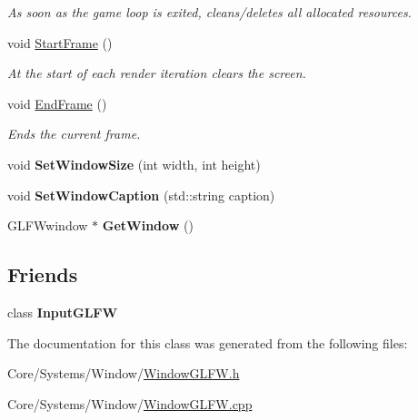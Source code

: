 \begin{DoxyCompactItemize}
\begin{DoxyCompactList}\small\item\em As soon as the game loop is exited, cleans/deletes all allocated resources. \end{DoxyCompactList}\item 
\hypertarget{classDCEngine_1_1Systems_1_1WindowGLFW_a09d7b716caed459967d25d527c950f28}{void \hyperlink{classDCEngine_1_1Systems_1_1WindowGLFW_a09d7b716caed459967d25d527c950f28}{Start\-Frame} ()}\label{classDCEngine_1_1Systems_1_1WindowGLFW_a09d7b716caed459967d25d527c950f28}

\begin{DoxyCompactList}\small\item\em At the start of each render iteration clears the screen. \end{DoxyCompactList}\item 
\hypertarget{classDCEngine_1_1Systems_1_1WindowGLFW_a35fda5b7925aa2c54d07b731c5b8ec3f}{void \hyperlink{classDCEngine_1_1Systems_1_1WindowGLFW_a35fda5b7925aa2c54d07b731c5b8ec3f}{End\-Frame} ()}\label{classDCEngine_1_1Systems_1_1WindowGLFW_a35fda5b7925aa2c54d07b731c5b8ec3f}

\begin{DoxyCompactList}\small\item\em Ends the current frame. \end{DoxyCompactList}\item 
\hypertarget{classDCEngine_1_1Systems_1_1WindowGLFW_a04af056648972074806a030f4407f6be}{void {\bfseries Set\-Window\-Size} (int width, int height)}\label{classDCEngine_1_1Systems_1_1WindowGLFW_a04af056648972074806a030f4407f6be}

\item 
\hypertarget{classDCEngine_1_1Systems_1_1WindowGLFW_afc36452ab50f4975c6a3ad86ccbeddbd}{void {\bfseries Set\-Window\-Caption} (std\-::string caption)}\label{classDCEngine_1_1Systems_1_1WindowGLFW_afc36452ab50f4975c6a3ad86ccbeddbd}

\item 
\hypertarget{classDCEngine_1_1Systems_1_1WindowGLFW_a7242f399d0caf6cde5a62579ad3fd936}{G\-L\-F\-Wwindow $\ast$ {\bfseries Get\-Window} ()}\label{classDCEngine_1_1Systems_1_1WindowGLFW_a7242f399d0caf6cde5a62579ad3fd936}

\end{DoxyCompactItemize}
\subsection*{Friends}
\begin{DoxyCompactItemize}
\item 
\hypertarget{classDCEngine_1_1Systems_1_1WindowGLFW_a6a2539c9c263eea562a5f9877b21c981}{class {\bfseries Input\-G\-L\-F\-W}}\label{classDCEngine_1_1Systems_1_1WindowGLFW_a6a2539c9c263eea562a5f9877b21c981}

\end{DoxyCompactItemize}


The documentation for this class was generated from the following files\-:\begin{DoxyCompactItemize}
\item 
Core/\-Systems/\-Window/\hyperlink{WindowGLFW_8h}{Window\-G\-L\-F\-W.\-h}\item 
Core/\-Systems/\-Window/\hyperlink{WindowGLFW_8cpp}{Window\-G\-L\-F\-W.\-cpp}\end{DoxyCompactItemize}
